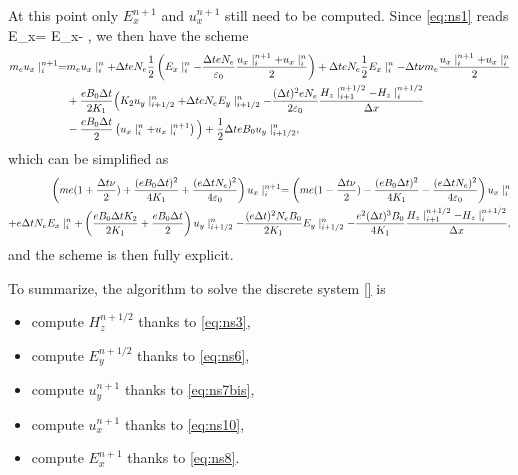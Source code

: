 At this point only $E_x^{n+1}$ and $u_x^{n+1}$ still need to be computed. 
Since \eqref{eq:ns1} reads
\be 
E_x\inp = E_x\midin - ,
\label{eq:ns8}
\ee
we then have the scheme 
\begin{align}
m_e u_x\mid_i^{n+1}= & m_e u_x\mid_i^{n}  + \Delta t e N_e \frac{1}{2}\left( E_x\mid_i^{n} - \frac{\Delta t e N_e}{{\bf \varepsilon}_0}\frac{u_x\mid_i^{n+1} + u_x\mid_i^{n}}{2}\right) + \Delta t  e N_e \frac{1}{2}E_x\mid_i^{n} -\Delta t\nu m_e\frac{u_x\mid_i^{n+1}+u_x \mid_i^{n}}{2}\nonumber\\
&+  \frac{e B_0 \Delta t}{2K_1}\Big(K_2 u_y\mid_{i+1/2}^{n} +\Delta t eN_e E_y\mid_{i+1/2}^{n} -  \frac{(\Delta t )^2 e N_e}{2{\bf \varepsilon}_0} \frac{H_z \mid_{i+1}^{n+1/2}- H_z \mid_{i}^{n+1/2}}{\Delta x}\nonumber\\
&- \frac{e B_0 \Delta t}{2}\left(u_x\mid_i^{n}+u_x\mid_i^{n+1}\right)\Big)+  \frac{1}{2}\Delta teB_0u_y\mid_{i+1/2}^{n},
\label{eq:ns9}
\end{align}
which can be simplified as
\begin{align}
 \left(me(1+\frac{\Delta t \nu}{2})+ \frac{(eB_0\Delta t)^2}{4K_1} + \frac{(e\Delta t N_e)^2}{4{\bf \varepsilon}_0}\right) u_x\mid_i^{n+1} 
= \left(me(1-\frac{\Delta t \nu}{2})- \frac{(eB_0\Delta t)^2}{4K_1} -\frac{(e\Delta t N_e)^2}{4{\bf \varepsilon}_0}\right) u_x\mid_i^{n} \nonumber\\
 + e \Delta t N_e E_x \mid_i^{n}  + \left( \frac{eB_0 \Delta t K_2}{2 K_1}+ \frac{e B_0 \Delta t}{2}\right) u_y\mid_{i+1/2}^{n} - \frac{(e\Delta t)^2 N_e B_0}{2K_1}E_y\mid_{i+1/2}^{n}  - \frac{e^2(\Delta t)^3 B_0}{4K_1}\frac{H_z \mid_{i+1}^{n+1/2}- H_z \mid_{i}^{n+1/2}}{\Delta x},
\label{eq:ns10} 
\end{align}
and the scheme is then fully explicit.

To summarize, the algorithm to solve the discrete system \eqref{} is
\begin{itemize}
\item compute $H_z^{n+1/2}$ thanks to \eqref{eq:ns3},
\item compute $E_y^{n+1/2}$ thanks to \eqref{eq:ns6},
\item compute $u_y^{n+1}$ thanks to \eqref{eq:ns7bis},
\item compute $u_x^{n+1}$ thanks to \eqref{eq:ns10},
\item compute $E_x^{n+1}$ thanks to \eqref{eq:ns8}.
\end{itemize}